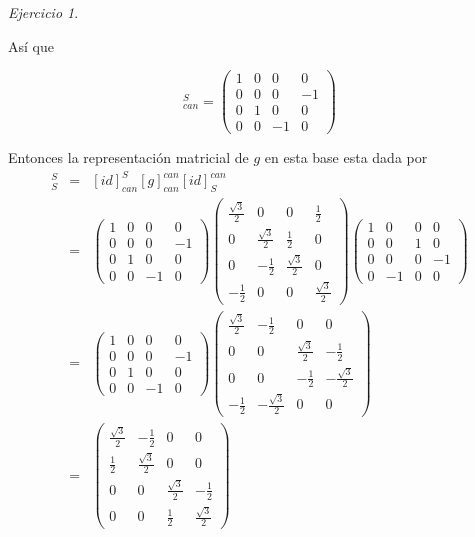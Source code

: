 \documentclass[11pt,a4paper]{article}
\theoremstyle{definition}
\theoremstyle{remark}
\newtheorem{exc}{Ejercicio}
\begin{document}
\begin{exc}
\begin{enumerate}
			Así que  
			
			\begin{equation}
			[id]_{can}^S=\begin{pmatrix}
			1 & 0 & 0 & 0
			\\ 0 & 0 & 0 & -1
			\\ 0 & 1 & 0 & 0  
			\\ 0 & 0 & -1 & 0
			\end{pmatrix} \nonumber
			\end{equation}
			
			Entonces la representación matricial de $ g $ en esta base esta dada por
			\begin{eqnarray}
			[g]_S^S & = & [id]_{can}^S[g]_{can}^{can}[id]_S^{can}\nonumber
			\\ & = & 
			\begin{pmatrix}
			1 & 0 & 0 & 0
			\\ 0 & 0 & 0 & -1
			\\ 0 & 1 & 0 & 0  
			\\ 0 & 0 & -1 & 0
			\end{pmatrix}
			\begin{pmatrix}
			\frac{\sqrt{3}}{2} & 0 & 0 & \frac{1}{2}
			\\ 0 & \frac{\sqrt{3}}{2} & \frac{1}{2} & 0 
			\\ 0 & -\frac{1}{2} & \frac{\sqrt{3}}{2} & 0
			\\ -\frac{1}{2} & 0 & 0 & \frac{\sqrt{3}}{2}
			\end{pmatrix} 
			\begin{pmatrix}
			1 & 0 & 0 & 0
			\\ 0 & 0 & 1 & 0  
			\\ 0 & 0 & 0 & -1
			\\ 0 & -1 & 0 & 0
			\end{pmatrix} \nonumber
			\\ & = &
			\begin{pmatrix}
			1 & 0 & 0 & 0
			\\ 0 & 0 & 0 & -1
			\\ 0 & 1 & 0 & 0  
			\\ 0 & 0 & -1 & 0
			\end{pmatrix}
			\begin{pmatrix}
			\frac{\sqrt{3}}{2} & -\frac{1}{2} & 0 & 0
			\\ 0 & 0 & \frac{\sqrt{3}}{2} & -\frac{1}{2}  
			\\ 0 & 0 & -\frac{1}{2} & -\frac{\sqrt{3}}{2}
			\\ -\frac{1}{2} & -\frac{\sqrt{3}}{2} & 0 & 0
			\end{pmatrix} \nonumber
			\\ & = & 
			\begin{pmatrix}
			\frac{\sqrt{3}}{2} & -\frac{1}{2} & 0 & 0
			\\ \frac{1}{2} & \frac{\sqrt{3}}{2} & 0 & 0
			\\ 0 & 0 & \frac{\sqrt{3}}{2} & -\frac{1}{2}  
			\\ 0 & 0 & \frac{1}{2} & \frac{\sqrt{3}}{2}
			\end{pmatrix} \nonumber
			\end{eqnarray}
			

\end{enumerate}
\end{exc}
\end{document}
